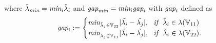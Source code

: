 \begin{theorem}
    where $\tilde{\lambda}_{\emph{min}} = \emph{min}_{i}\tilde{\lambda}_{i}$ and $\emph{gap}_{\emph{min}} = \emph{min}_{i}\emph{gap}_{i}$ with $\emph{gap}_{i}$ defined as 
    \begin{align*}
        \emph{gap}_{i}:= \begin{cases}
            \emph{min}_{\tilde{\lambda}_{j}\in\mathbb{V}_{22}}|\tilde{\lambda_{i}} - \tilde{\lambda_{j}}|, \ \ \emph{if}\ \ \tilde{\lambda}_{i} \in \lambda(\mathbb{V}_{11})\\
            \emph{min}_{\tilde{\lambda}_{j}\in\mathbb{V}_{11}}|\tilde{\lambda_{i}} - \tilde{\lambda_{j}}|, \ \ \emph{if}\ \  \tilde{\lambda}_{i} \in \lambda(\mathbb{V}_{22}).
        \end{cases}
    \end{align*} 
\end{theorem}
